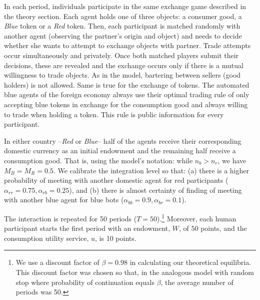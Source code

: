 In each period, individuals participate in the same exchange game described in the theory section. Each agent holds one of three objects: a consumer good, a \textit{Blue} token or a \textit{Red} token. Then, each participant is matched randomly with another agent (observing the partner's origin and object) and needs to decide whether she wants to attempt to exchange objects with partner. Trade attempts occur simultaneously and privately. Once both matched players submit their decisions, these are revealed and the exchange occurs only if there is a mutual willingness to trade objects. As in the model, bartering between sellers (good holders) is not allowed. Same is true for the exchange of tokens. The automated blue agents of the foreign economy always use their optimal trading rule of only accepting blue tokens in exchange for the consumption good and always willing to trade when holding a token. This rule is public information for every participant.

In either country --\textit{Red} or \textit{Blue}-- half of the agents receive their corresponding domestic currency as an initial endowment and the remaining half receive a consumption good. That is, using the model's notation: while $n_b > n_r$, we have $M_B = M_R = 0.5$. We calibrate the integration level so that: (a) there is a higher probability of meeting with another domestic agent for red participants ($\alpha_{rr}=0.75, \alpha_{rb}=0.25$), and (b) there is almost certainty of finding of meeting with another blue agent for blue bots ($\alpha_{bb}=0.9, \alpha_{br}=0.1$).

The interaction is repeated for 50 periods ($T=50$).\footnote{We use a discount factor of $\beta = 0.98$ in calculating our theoretical equilibria. This discount factor was chosen so that, in the analogous model with random stop where probability of continuation equals $\beta$, the average number of periods was 50.} 
Moreover, each human participant starts the first period with an endowment, $W$, of $50$ points, and the consumption utility service, $u$, is 10 points.

